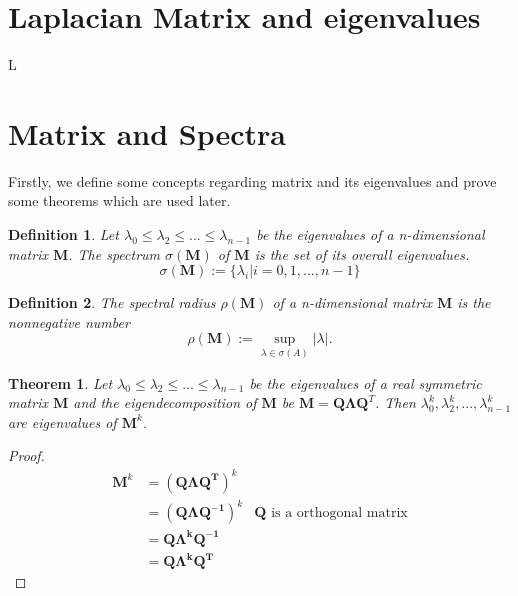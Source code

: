 \documentclass[senior,final,11pt]{iscs-thesis}
\newtheorem{theorem}{Theorem}
\newtheorem{definition}{Definition}
\begin{document}
\section{Laplacian Matrix and eigenvalues}
L

\section{Matrix and Spectra}
Firstly, we define some concepts regarding matrix and its eigenvalues and prove some theorems which are used later.
\begin{definition}
    Let $\lambda_0 \leq \lambda_2 \leq ... \leq \lambda_{n-1}$ be the eigenvalues of a n-dimensional matrix $\mathbf{M}$. The spectrum $\sigma(\mathbf{M})$ of $\mathbf{M}$ is the set of its overall eigenvalues.
    \[\sigma(\mathbf{M}) := \{\lambda_i | i=0,1,...,n-1\}\]
\end{definition}
\begin{definition}
    The spectral radius $\rho(\mathbf{M})$ of a n-dimensional matrix $\mathbf{M}$ is the nonnegative number
    \[\rho(\mathbf{M}):=\sup_{\lambda \in \sigma(A)} |\lambda|.\]
\end{definition}

\begin{theorem}
    \label{power_eigenvalues}
    Let $\lambda_0 \leq \lambda_2 \leq ... \leq \lambda_{n-1}$ be the eigenvalues of a real symmetric matrix $\mathbf{M}$ and the eigendecomposition of $\mathbf{M}$ be $\mathbf{M}=\mathbf{Q}\mathbf{\Lambda}\mathbf{Q}^T$. Then $\lambda_0^k, \lambda_2^k, ..., \lambda_{n-1}^k$ are eigenvalues of $\mathbf{M}^k$.
\end{theorem}
\begin{proof}
    \begin{align*}
        \mathbf{M}^k &= (\mathbf{\mathbf{Q}\mathbf{\Lambda}\mathbf{Q}^T})^k \\
        &= (\mathbf{\mathbf{Q}\mathbf{\Lambda}\mathbf{Q}^{-1}})^k &\text{$\mathbf{Q}$ is a orthogonal matrix}\\
        &= \mathbf{\mathbf{Q}\mathbf{\Lambda}^k\mathbf{Q}^{-1}}\\
        &= \mathbf{\mathbf{Q}\mathbf{\Lambda}^k\mathbf{Q}^T}
    \end{align*}
\end{proof}
\end{document}
